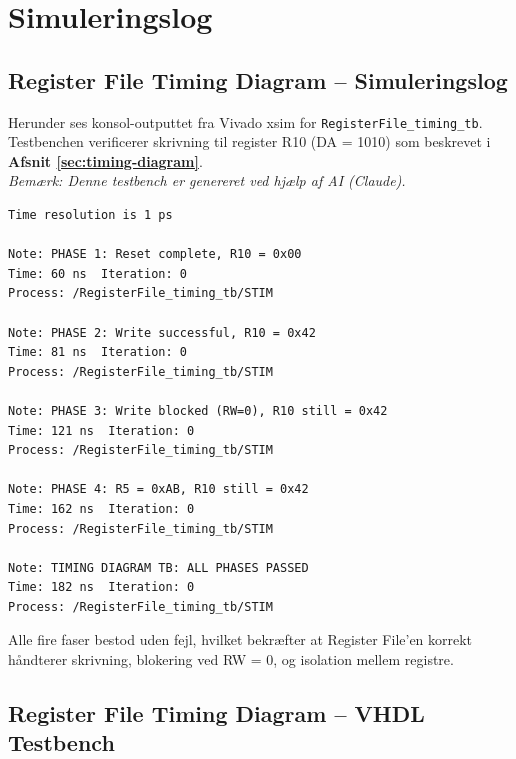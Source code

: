 \documentclass{article}
\begin{document}
\fi

\newpage
\appendix

\section{Simuleringslog}
\label{sec:appendix-sim-logs}

\subsection{Register File Timing Diagram -- Simuleringslog}
\label{sec:appendix-timing-log}

Herunder ses konsol-outputtet fra Vivado xsim for \texttt{RegisterFile\_timing\_tb}. Testbenchen verificerer skrivning til register R10 (DA = 1010) som beskrevet i \textbf{Afsnit \ref{sec:timing-diagram}}.\\
\textit{Bemærk: Denne testbench er genereret ved hjælp af AI (Claude).}

\begin{lstlisting}[style=vhdl, language={}, title={Vivado xsim konsol-output}]
Time resolution is 1 ps

Note: PHASE 1: Reset complete, R10 = 0x00
Time: 60 ns  Iteration: 0
Process: /RegisterFile_timing_tb/STIM

Note: PHASE 2: Write successful, R10 = 0x42
Time: 81 ns  Iteration: 0
Process: /RegisterFile_timing_tb/STIM

Note: PHASE 3: Write blocked (RW=0), R10 still = 0x42
Time: 121 ns  Iteration: 0
Process: /RegisterFile_timing_tb/STIM

Note: PHASE 4: R5 = 0xAB, R10 still = 0x42
Time: 162 ns  Iteration: 0
Process: /RegisterFile_timing_tb/STIM

Note: TIMING DIAGRAM TB: ALL PHASES PASSED
Time: 182 ns  Iteration: 0
Process: /RegisterFile_timing_tb/STIM
\end{lstlisting}

\noindent
Alle fire faser bestod uden fejl, hvilket bekræfter at Register File'en korrekt håndterer skrivning, blokering ved RW = 0, og isolation mellem registre.

\subsection{Register File Timing Diagram -- VHDL Testbench}
\label{sec:appendix-timing-vhdl}
\end{document}

